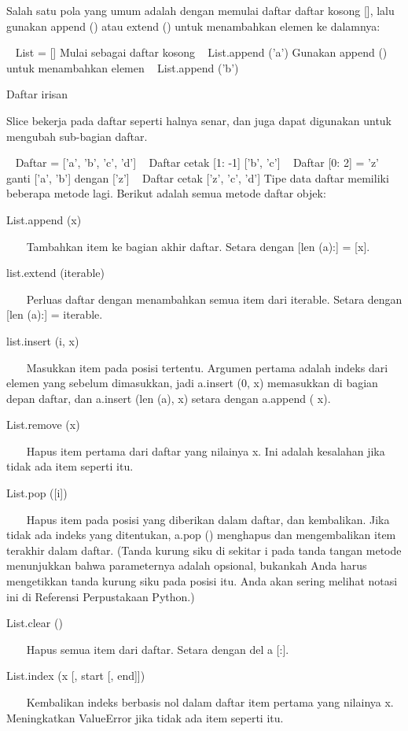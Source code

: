 Salah satu pola yang umum adalah dengan memulai daftar daftar kosong [], lalu gunakan append () atau extend () untuk menambahkan elemen ke dalamnya: 

~ List = []            Mulai sebagai daftar kosong 
~ List.append ('a')            Gunakan append () untuk menambahkan elemen 
~ List.append ('b') 

Daftar irisan 

Slice bekerja pada daftar seperti halnya senar, dan juga dapat digunakan untuk mengubah sub-bagian daftar. 

~ Daftar = ['a', 'b', 'c', 'd'] 
~ Daftar cetak [1: -1]            ['b', 'c'] 
~ Daftar [0: 2] = 'z'            ganti ['a', 'b'] dengan ['z'] 
~ Daftar cetak            ['z', 'c', 'd'] 
Tipe data daftar memiliki beberapa metode lagi. Berikut adalah semua metode daftar objek: 

List.append (x) 

~~~ Tambahkan item ke bagian akhir daftar. Setara dengan [len (a):] = [x]. 

list.extend (iterable) 

~~~ Perluas daftar dengan menambahkan semua item dari iterable. Setara dengan [len (a):] = iterable. 

list.insert (i, x) 

~~~ Masukkan item pada posisi tertentu. Argumen pertama adalah indeks dari elemen yang sebelum dimasukkan, jadi a.insert (0, x) memasukkan di bagian depan daftar, dan a.insert (len (a), x) setara dengan a.append ( x). 

List.remove (x) 

~~~ Hapus item pertama dari daftar yang nilainya x. Ini adalah kesalahan jika tidak ada item seperti itu. 

List.pop ([i]) 

~~~ Hapus item pada posisi yang diberikan dalam daftar, dan kembalikan. Jika tidak ada indeks yang ditentukan, a.pop () menghapus dan mengembalikan item terakhir dalam daftar. (Tanda kurung siku di sekitar i pada tanda tangan metode menunjukkan bahwa parameternya adalah opsional, bukankah Anda harus mengetikkan tanda kurung siku pada posisi itu. Anda akan sering melihat notasi ini di Referensi Perpustakaan Python.) 

List.clear () 

~~~ Hapus semua item dari daftar. Setara dengan del a [:]. 

List.index (x [, start [, end]]) 

~~~ Kembalikan indeks berbasis nol dalam daftar item pertama yang nilainya x. Meningkatkan ValueError jika tidak ada item seperti itu. 

